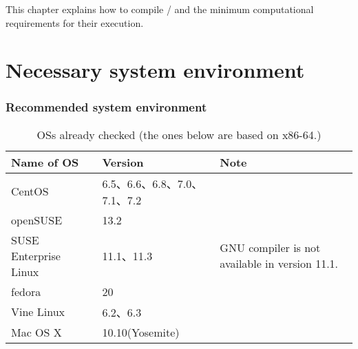 This chapter explains how to compile \scalelib / \scalerm
and the minimum computational requirements for their execution.

\section{Necessary system environment} \label{sec:req_env}
\subsubsection{Recommended system environment}

\begin{table}[b]
\begin{center}
\caption{OSs already checked (the ones below are based on x86-64.)}
\begin{tabularx}{150mm}{|l|l|X|} \hline
 \rowcolor[gray]{0.9} Name of OS & Version & Note \\ \hline
 CentOS                & 6.5、6.6、6.8、7.0、7.1、7.2 &  \\ \hline
 openSUSE              & 13.2               &  \\ \hline
 SUSE Enterprise Linux & 11.1、11.3         & GNU compiler is not available in version 11.1. \\ \hline
 fedora                & 20                 &  \\ \hline
 Vine Linux            & 6.2、6.3           &  \\ \hline
 Mac OS X              & 10.10(Yosemite)    &  \\ \hline
\end{tabularx}
\label{tab:compatible_os}
\end{center}
\end{table}


